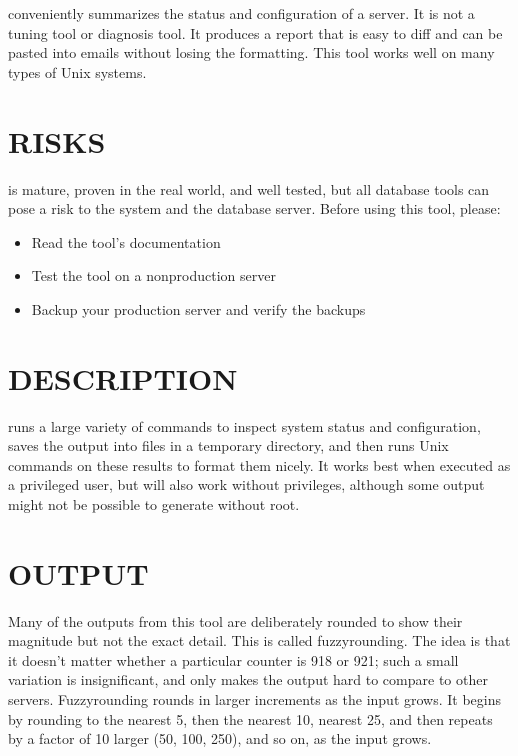 \documentclass[letterpaper,10pt,english]{sphinxmanual}
\begin{document}
\sphinxAtStartPar
{} conveniently summarizes the status and configuration of
a server. It is not a tuning tool or diagnosis tool.  It produces a report that
is easy to diff and can be pasted into emails without losing the formatting.
This tool works well on many types of Unix systems.


\section{RISKS}
\label{\detokenize{mariadb-system-summary:risks}}
\sphinxAtStartPar
{} is mature, proven in the real world, and well tested,
but all database tools can pose a risk to the system and the database
server.  Before using this tool, please:
\begin{itemize}
\item {} 
\sphinxAtStartPar
Read the tool’s documentation

\item {} 
\sphinxAtStartPar
Test the tool on a non\sphinxhyphen{}production server

\item {} 
\sphinxAtStartPar
Backup your production server and verify the backups

\end{itemize}


\section{DESCRIPTION}
\label{\detokenize{mariadb-system-summary:description}}
\sphinxAtStartPar
{} runs a large variety of commands to inspect system status and
configuration, saves the output into files in a temporary directory, and
then runs Unix commands on these results to format them nicely.  It works
best when executed as a privileged user, but will also work without privileges,
although some output might not be possible to generate without root.


\section{OUTPUT}
\label{\detokenize{mariadb-system-summary:output}}
\sphinxAtStartPar
Many of the outputs from this tool are deliberately rounded to show their
magnitude but not the exact detail. This is called fuzzy\sphinxhyphen{}rounding. The idea is
that it doesn’t matter whether a particular counter is 918 or 921; such a small
variation is insignificant, and only makes the output hard to compare to other
servers. Fuzzy\sphinxhyphen{}rounding rounds in larger increments as the input grows. It
begins by rounding to the nearest 5, then the nearest 10, nearest 25, and then
repeats by a factor of 10 larger (50, 100, 250), and so on, as the input grows.
\end{document}
